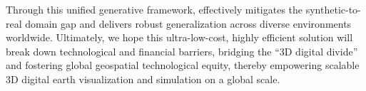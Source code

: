 Through this unified generative framework, \method{} effectively mitigates the synthetic-to-real domain gap and delivers robust generalization across diverse environments worldwide. Ultimately, we hope this ultra-low-cost, highly efficient solution will break down technological and financial barriers, bridging the ``3D digital divide'' and fostering global geospatial technological equity, thereby empowering scalable 3D digital earth visualization and simulation on a global scale.
